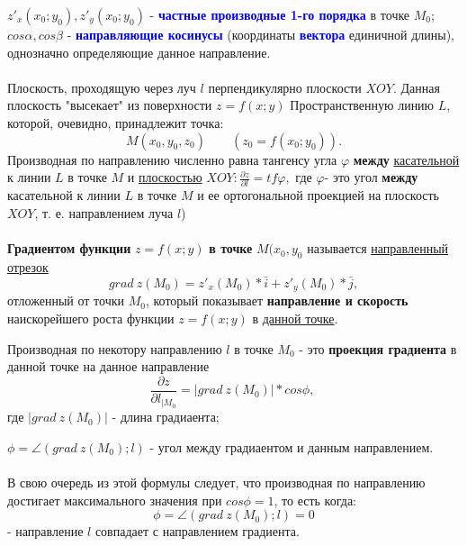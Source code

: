 \documentclass[14pt, letterpaper]{article}
\begin{document}
$z\prime_{x}(x_{0}; y_{0}), z\prime_{y}(x_{0}; y_{0})$  - \textbf{\textcolor{blue}{частные производные 1-го порядка}} в точке $M_{0}$;
$cos\alpha, cos\beta$ - \textbf{\textcolor{blue}{направляющие косинусы}} (координаты  \textbf{\textcolor{blue}{вектора}} единичной длины), однозначно определяющие данное направление.

\paragraph{}

Плоскость, проходящую через луч $l$ перпендикулярно плоскости $XOY$. Данная плоскость "высекает" из поверхности $z = f(x; y)$ Пространственную линию $L$, которой, очевидно, принадлежит точка: $$M(x_{0}, y_{0}, z_{0})\qquad (z_{0} = f(x_{0}; y_{0})).$$ Производная по направлению численно равна тангенсу угла $\varphi$ \textbf{между} \underline{касательной} к линии $L$ в точке $M$ и \underline{плоскостью} $XOY: \frac{\partial z}{\partial l} = tf\varphi, $ где $\varphi$- это угол \textbf{между} касательной к линии $L$ в точке $M$ и ее ортогональной проекцией на плоскость $XOY$, т. е. направлением луча $l$)

\paragraph{}

\textbf{Градиентом функции} $z = f(x; y)$ \textbf{в точке} $M(x_{0}, y_{0}$ называется \underline{направленный отрезок} 
    $$grad \: z(M_{0}) = z\prime_{x}(M_{0})*\bar i + z\prime_{y}(M_{0})*\bar j, $$
    отложенный от точки $M_{0}$, который показывает \textbf{направление и скорость} наискорейшего роста функции $z = f(x; y)$ в \underline{данной точке}.

Производная по некотору направлению $l$ в точке $M_{0}$ - это \textbf{проекция градиента} в данной точке на данное направление
$$\frac{\partial z}{\partial l_{|M_{0}}} = |grad \: z(M_{0})|*cos\phi, \: $$
где $|grad \: z(M_{0})|$ - длина градиаента;

$\phi = \angle(grad \:z(M_{0}); l)$ - угол между градиаентом и данным направлением.

\paragraph{}
В свою очередь из этой формулы следует, что производная по направлению достигает максимального значения при $cos\phi = 1$, то есть когда:
    $$\phi = \angle(grad \:z(M_{0}); l) = 0$$- 
    направление $l$ совпадает с направлением градиента.
\end{document}
